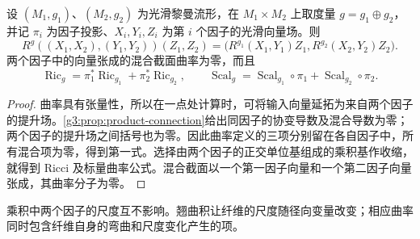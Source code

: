 \begin{proposition}\label{g3:prop:product-curvature}
	设 \((M_1,g_1)\)、\((M_2,g_2)\) 为光滑黎曼流形，在 \(M_1\times M_2\) 上取度量 \(g=g_1\oplus g_2\)，并记 \(\pi_i\) 为因子投影、\(X_i,Y_i,Z_i\) 为第 \(i\) 个因子的光滑向量场。则
	\[
		R^g((X_1,X_2),(Y_1,Y_2))(Z_1,Z_2)
		=\bigl(R^{g_1}(X_1,Y_1)Z_1,R^{g_2}(X_2,Y_2)Z_2\bigr).
	\]
	两个因子中的向量张成的混合截面曲率为零，而且
	\[
		\operatorname{Ric}_g=\pi_1^*\operatorname{Ric}_{g_1}
		+\pi_2^*\operatorname{Ric}_{g_2},\qquad
		\operatorname{Scal}_g=\operatorname{Scal}_{g_1}\circ\pi_1
		+\operatorname{Scal}_{g_2}\circ\pi_2.
	\]
\end{proposition}
\begin{proof}
	曲率具有张量性，所以在一点处计算时，可将输入向量延拓为来自两个因子的提升场。\cref{g3:prop:product-connection}给出同因子的协变导数及混合导数为零；两个因子的提升场之间括号也为零。因此曲率定义的三项分别留在各自因子中，所有混合项为零，得到第一式。选择由两个因子的正交单位基组成的乘积基作收缩，就得到 Ricci 及标量曲率公式。混合截面以一个第一因子向量和一个第二因子向量张成，其曲率分子为零。
\end{proof}

乘积中两个因子的尺度互不影响。翘曲积让纤维的尺度随径向变量改变；相应曲率同时包含纤维自身的弯曲和尺度变化产生的项。

